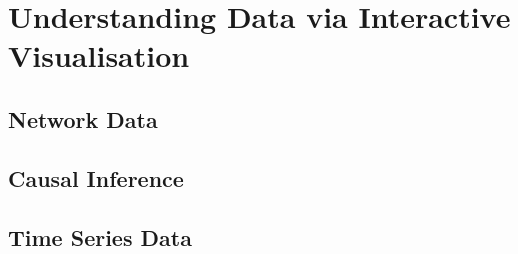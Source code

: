 \section{Understanding Data via Interactive Visualisation}
\subsection{Network Data}
\subsection{Causal Inference}
\subsection{Time Series Data}